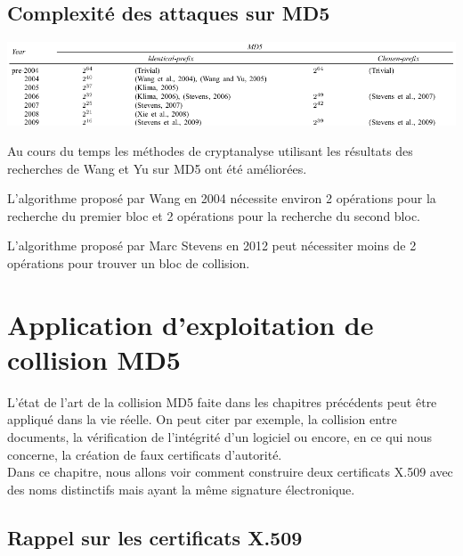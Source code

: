 \subsection{Complexité des attaques sur MD5}

\includegraphics[scale=.50]{./images/complexite.png}

\vspace{.5cm}
Au cours du temps les méthodes de cryptanalyse utilisant les résultats des recherches de Wang et Yu sur MD5 ont été améliorées. 

L'algorithme proposé par Wang en 2004 nécessite environ 2 opérations pour la recherche du premier bloc et 2 opérations pour la recherche du second bloc.

L'algorithme proposé par Marc Stevens en 2012 peut nécessiter moins de 2 opérations pour trouver un bloc de collision.

\section{Application d'exploitation de collision MD5}

L'état de l'art de la collision MD5 faite dans les chapitres précédents peut être appliqué dans la vie réelle. On peut citer par exemple, la collision entre documents, la vérification de l'intégrité d'un logiciel ou encore, en ce qui nous concerne, la création de faux certificats d'autorité. \\

Dans ce chapitre, nous allons voir comment construire deux certificats X.509 avec des noms distinctifs mais ayant la même signature électronique.



\subsection{Rappel sur les certificats X.509}

